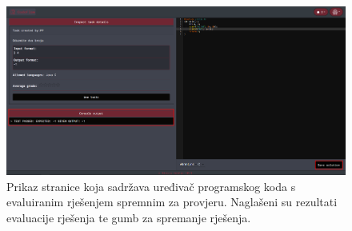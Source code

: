 \documentclass[times, utf8, zavrsni]{fer}
\begin{document}
		\begin{figure}[htb]
			\centering
			\includegraphics[width=\linewidth]{pictures/koristenje/RijeseniZadatak.png}
			\caption{Prikaz stranice koja sadržava uređivač programskog koda s evaluiranim rješenjem spremnim za provjeru. Naglašeni su rezultati evaluacije rješenja te gumb za spremanje rješenja.}
			\label{fig:rjeseno}
		\end{figure}
	
\end{document}
